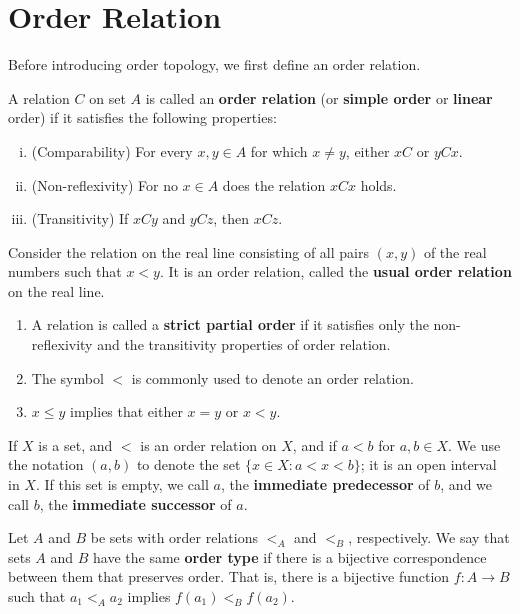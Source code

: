 \documentclass[a4paper,english,12pt]{article}
\begin{document}
\section{Order Relation}  

Before introducing order topology, we first define an order relation.
\begin{defn}
A relation $C$ on set $A$ is called an \textbf{order relation} (or  \textbf{simple order} or \textbf{linear} order) if it satisfies the following properties:
\begin{enumerate}[i)]
\item (Comparability) For every $x, y \in A$ for which $x \neq y$, either $x C$ or $y C x$.
\item (Non-reflexivity) For no $x \in A$ does the relation $x C x$ holds.
\item (Transitivity) If $x C y$ and $y C z$, then $x C z$.
\end{enumerate}
\end{defn}

\begin{exmp}
Consider the relation on the real line consisting of all pairs $(x, y)$ of the real numbers such that $x < y$. It is an order relation, called the \textbf{usual order relation} on the real line.
\end{exmp}


\begin{rem}
\begin{enumerate}
\item A relation is called a \textbf{strict partial order} if it satisfies only the non-reflexivity and the transitivity properties of order relation.    
\item The symbol $<$ is commonly used to denote an order relation.
\item $x \le y$ implies that either $x = y$ or $x < y$. 
\end{enumerate}
\end{rem}

\begin{defn}
If $X$ is a set, and $<$ is an order relation on $X$, and if $a < b$ for $a, b \in X$. We use the notation $(a,b)$ to denote the set $ \{ x \in X: a < x < b \}$; it is an open interval in $X$. If this set is empty, we call $a$, the \textbf{immediate predecessor} of $b$, and we call $b$, the \textbf{immediate successor} of $a$.
\end{defn}


\begin{defn}
Let $A$ and $B$ be sets with order relations $<_{A}$ and $<_{B}$, respectively. We say that sets $A$ and $B$ have the same \textbf{order type} if there is a bijective correspondence between them that preserves order. That is, there is a bijective function $f: A \to B$ such that $a_{1} <_{A} a_{2}$ implies $f(a_{1}) <_{B} f(a_{2})$.
\end{defn}
\end{document}
